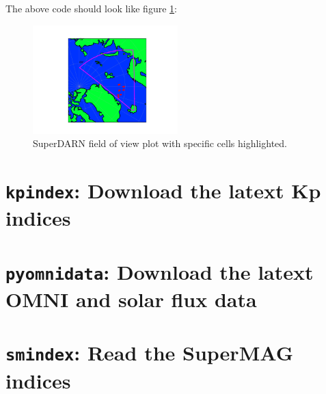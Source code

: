 				The above code should look like figure \ref{FigSDFOV}:
			
				\begin{figure}
					\centering\includegraphics[width=0.5\textwidth]{figures/ch05_sdfov.png}
					\caption{SuperDARN field of view plot with specific cells highlighted.\label{FigSDFOV}}
					
				\end{figure}
			


	\section{\texttt{kpindex}: Download the latext Kp indices}

	\section{\texttt{pyomnidata}: Download the latext OMNI and solar flux data}

	\section{\texttt{smindex}: Read the SuperMAG indices}




